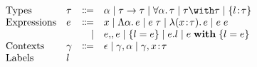 \[
\begin{array}{l}
  \begin{array}{llrl}
    \text{Types} 
    & \tau & \Coloneqq & \alpha \mid \tau \to \tau \mid \Forall \alpha \tau \mid
                        \tau \Intersect \tau \mid \RecTy l \tau \\
    \text{Expressions} 
    & e & \Coloneqq & x \mid \BLam \alpha e \mid \TApp e \tau \mid \Lam x \tau e \mid \App e e \\
    &   & \mid      & e \Merge e \mid \RecCon l e \mid  e.l \mid \RecUpd e l e \\
    \text{Contexts} 
    & \gamma & \Coloneqq & \epsilon \mid \gamma, \alpha \mid \gamma, x \hast \tau \\
    \text{Labels} & l
  \end{array} 
\end{array}
\]
